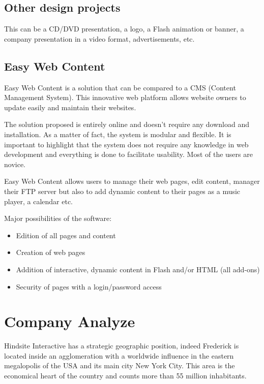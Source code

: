 \subsection{Other design projects}

This can be a CD/DVD presentation, a logo, a Flash animation or banner, a
company presentation in a video format, advertisements, etc.

\subsection{Easy Web Content}

Easy Web Content is a solution that can be compared to a CMS (Content
Management System). This innovative web platform allows website owners to
update easily and maintain their websites.

The solution proposed is entirely online and doesn’t require any download and
installation. As a matter of fact, the system is modular and flexible.
It is important to highlight that the system does not require any knowledge in web
development and everything is done to facilitate usability. Most of the users are
novice.

Easy Web Content allows users to manage their web pages, edit content, manager
their FTP server but also to add dynamic content to their pages as a music player, a calendar etc.


Major possibilities of the software:

\begin{itemize}
\item Edition of all pages and content
\item Creation of web pages
\item Addition of interactive, dynamic content in Flash and/or HTML (all add-ons)
\item Security of pages with a login/password access
\end{itemize}

\section{Company Analyze}

Hindsite Interactive has a strategic geographic position, indeed Frederick is
located inside an agglomeration with a worldwide influence in the eastern
megalopolis of the USA and its main city New York City. This area is the
economical heart of the country and counts more than 55 million inhabitants.

